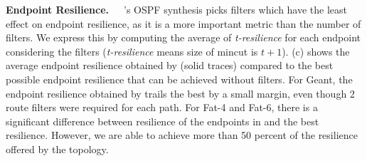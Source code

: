 \begin{figure}
	\centering
\end{figure}

\noindent\textbf{Endpoint Resilience.}~~~\name's OSPF synthesis picks
filters which have the least effect on endpoint resilience, as it  
is a more important metric than the number of filters. We express this
by computing the average of \emph{t-resilience} for each endpoint considering
the filters (\emph{t-resilience} means size of mincut is $t+1$).
(c) shows the average
endpoint resilience obtained by \name (solid traces) 
compared to the best possible endpoint resilience that  can be achieved
without filters. For Geant, the endpoint 
resilience obtained by \name trails the best by a small margin,
even though 2 route filters were required for each path. For
Fat-4 and Fat-6, there is a significant difference between resilience
of the endpoints in \name and the best resilience. 
However, we are able to achieve more than
50 percent of the resilience offered by the topology. 

